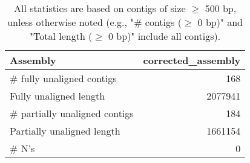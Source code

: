 \documentclass[12pt,a4paper]{article}
\begin{document}
\begin{table}[ht]
\begin{center}
\caption{All statistics are based on contigs of size $\geq$ 500 bp, unless otherwise noted (e.g., "\# contigs ($\geq$ 0 bp)" and "Total length ($\geq$ 0 bp)" include all contigs).}
\begin{tabular}{|l*{1}{|r}|}
\hline
Assembly & corrected\_assembly \\ \hline
\# fully unaligned contigs & 168 \\ \hline
Fully unaligned length & 2077941 \\ \hline
\# partially unaligned contigs & 184 \\ \hline
Partially unaligned length & 1661154 \\ \hline
\# N's & 0 \\ \hline
\end{tabular}
\end{center}
\end{table}
\end{document}
